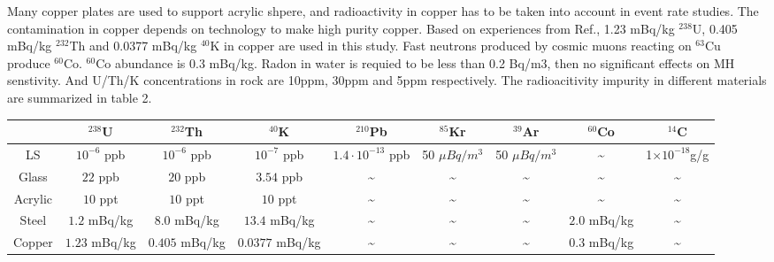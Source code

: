 \documentclass[a4paper,10pt,twoside]{paper}
\begin{document}
\begin{multicols}{2}
                Many copper plates are used to support acrylic shpere, and radioactivity in copper has to be taken into account in event rate studies.
		The contamination in copper depends on technology to make high purity copper. Based on experiences from Ref., 1.23 mBq/kg $^{238}$U, 0.405 mBq/kg $^{232}$Th and 0.0377 mBq/kg $^{40}$K in copper are used in this study. 
		Fast neutrons produced by cosmic muons reacting on $^{63}$Cu produce $^{60}$Co. $^{60}$Co abundance is 0.3 mBq/kg.
                Radon in water is requied to be less than 0.2 Bq/m3, then no significant effects on MH senstivity. And U/Th/K concentrations in rock are 10ppm, 30ppm and 5ppm respectively.
                The radioacitivity impurity in different materials are summarized in table 2. 

	\end{multicols}
	\begin{center}
		\footnotesize
		\begin{tabular*}{190mm}{@{\extracolsep{\fill}}ccccccccc}
			\toprule \hphantom{0} & $^{238}$U & $^{232}$Th & $^{40}$K  & $^{210}$Pb & $^{85}$Kr & $^{39}$Ar & $^{60}$Co & $^{14}$C\\
			\hline
			LS & $10^{-6}$ ppb & $10^{-6}$ ppb & $10^{-7}$ ppb & $1.4\cdot10^{-13}$ ppb & 50 $\mu Bq/m^3$ & 50 $\mu Bq/m^3$ & \~{}  & 1$\times10^{-18}$g/g \\
			Glass & $22$ ppb & $20$ ppb & $3.54$ ppb & \~{} & \~{} & \~{} & \~{} & \~{} \\
			Acrylic & $10$ ppt  & $10$ ppt & $10$ ppt & \~{} & \~{} & \~{} & \~{} & \~{} \\
			Steel & $ 1.2$ mBq/kg & $8.0$ mBq/kg  & $13.4$ mBq/kg & \~{} & \~{} & \~{}& $2.0 $ mBq/kg  & \~{} \\
			Copper & $1.23$ mBq/kg  & $0.405$ mBq/kg & $0.0377$ mBq/kg & \~{} & \~{} & \~{} & $0.3 $ mBq/kg & \~{} \\
			\bottomrule
		\end{tabular*}
	\end{center}
\end{document}
